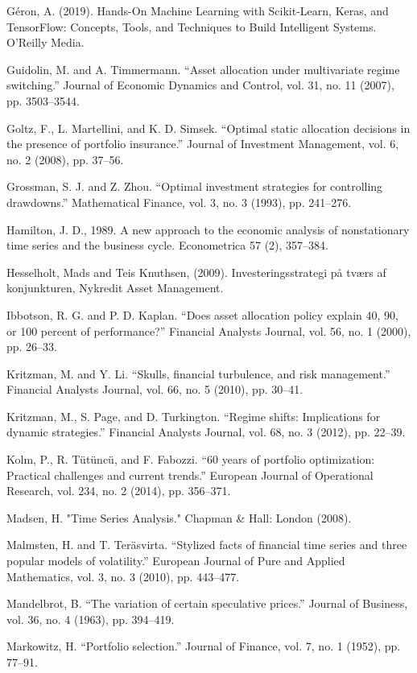 Géron, A. (2019). Hands-On Machine Learning with Scikit-Learn, Keras, and TensorFlow: Concepts, Tools, and Techniques to Build Intelligent Systems. O’Reilly Media.

Guidolin, M. and A. Timmermann. “Asset allocation under multivariate regime switching.” Journal of Economic Dynamics and Control, vol. 31, no. 11 (2007), pp. 3503–3544.

Goltz, F., L. Martellini, and K. D. Simsek. “Optimal static allocation decisions
in the presence of portfolio insurance.” Journal of Investment Management,
vol. 6, no. 2 (2008), pp. 37–56.

Grossman, S. J. and Z. Zhou. “Optimal investment strategies for controlling
drawdowns.” Mathematical Finance, vol. 3, no. 3 (1993), pp. 241–276.

Hamilton, J. D., 1989. A new approach to the economic analysis of nonstationary time series and the business cycle. Econometrica 57 (2), 357–384.


Hesselholt, Mads and Teis Knuthsen, (2009). Investeringsstrategi på tværs af konjunkturen, Nykredit Asset Management.

Ibbotson, R. G. and P. D. Kaplan. “Does asset allocation policy explain 40, 90, or 100 percent of performance?” Financial Analysts Journal, vol. 56, no. 1 (2000), pp. 26–33.

Kritzman, M. and Y. Li. “Skulls, financial turbulence, and risk management.” Financial Analysts Journal, vol. 66, no. 5 (2010), pp. 30–41.

Kritzman, M., S. Page, and D. Turkington. “Regime shifts: Implications for dynamic strategies.” Financial Analysts Journal, vol. 68, no. 3 (2012), pp. 22–39.

Kolm, P., R. Tütüncü, and F. Fabozzi. “60 years of portfolio optimization: Practical challenges and current trends.” European Journal of Operational Research, vol. 234, no. 2 (2014), pp. 356–371.

Madsen, H. "Time Series Analysis." Chapman \& Hall: London (2008).

Malmsten, H. and T. Teräsvirta. “Stylized facts of financial time series and three popular models of volatility.” European Journal of Pure and Applied Mathematics, vol. 3, no. 3 (2010), pp. 443–477.

Mandelbrot, B. “The variation of certain speculative prices.” Journal of Business, vol. 36, no. 4 (1963), pp. 394–419.

Markowitz, H. “Portfolio selection.” Journal of Finance, vol. 7, no. 1 (1952), pp. 77–91.

